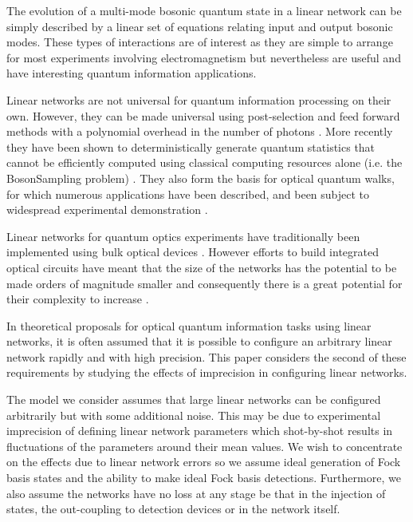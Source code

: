\documentclass[aps,pra,twocolumn,superscriptaddress,numerical,floatfix]{revtex4-1}
\begin{document}
The evolution of a multi-mode bosonic quantum state in a linear network can be simply described by a linear set of equations relating input and output bosonic modes.  These types of interactions are of interest as they are simple to arrange for most experiments involving electromagnetism but nevertheless are useful and have interesting quantum information applications.  

Linear networks are not universal for quantum information processing on their own.  However, they can be made universal using post-selection and feed forward methods with a polynomial overhead in the number of photons \cite{KLM,one-way_quantum_computer,OQC}. More recently they have been shown to deterministically generate quantum statistics that cannot be efficiently computed using classical computing resources alone (i.e.  the BosonSampling problem) \cite{Boson}. They also form the basis for optical quantum walks, for which numerous applications have been described, and been subject to widespread experimental demonstration \cite{bib:aharonov1993quantum,bib:Broome10,bib:PeruzzoQW,bib:RohdeQWExp12,bib:Schreiber10}.

Linear networks for quantum optics experiments have traditionally been implemented using bulk optical devices \cite{OQC}. 
However efforts to build integrated optical circuits have meant that the size of the networks has the potential to be made orders of magnitude smaller and consequently there is a great potential for their complexity to increase \cite{thompson2011integrated}.

In theoretical proposals for optical quantum information tasks using linear networks, it is often assumed that it is possible to configure an arbitrary linear network rapidly and with high precision.  This paper considers the second of these requirements by studying the effects of imprecision in configuring linear networks.

The model we consider assumes that large linear networks can be configured arbitrarily but with some additional noise.  This may be due to experimental imprecision of defining linear network parameters which shot-by-shot results in fluctuations of the parameters around their mean values.  We wish to concentrate on the effects due to linear network errors so we assume ideal generation of Fock basis states and the ability to make ideal Fock basis detections. Furthermore, we also assume the networks have no loss at any stage be that in the injection of states, the out-coupling to detection devices or in the network itself.  
\end{document}
